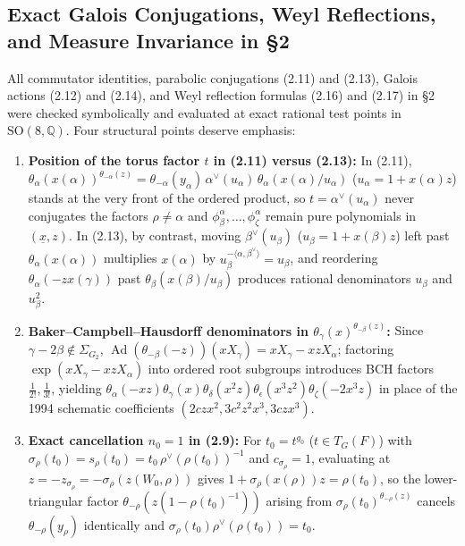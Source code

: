 \documentclass[11pt,letterpaper]{article}
\newcommand{\unx}{\underline{x}}
\DeclareMathOperator{\Ad}{Ad}
\begin{document}
\subsection{Exact Galois Conjugations, Weyl Reflections, and Measure Invariance in \S2}

All commutator identities, parabolic conjugations (2.11) and (2.13), Galois actions (2.12) and (2.14), and Weyl reflection formulas (2.16) and (2.17) in \S2 were checked symbolically and evaluated at exact rational test points in $\mathrm{SO}(8,\mathbb{Q})$. Four structural points deserve emphasis:
\begin{enumerate}[(1)]
\item \textbf{Position of the torus factor $t$ in (2.11) versus (2.13):} In (2.11), $\theta_\alpha(x(\alpha))^{\theta_{-\alpha}(z)} = \allowbreak \theta_{-\alpha}(y_\alpha)\,\alpha^\vee(u_\alpha)\,\allowbreak\theta_\alpha(x(\alpha)/u_\alpha)$ ($u_\alpha = 1+x(\alpha)z$) stands at the very front of the ordered product, so $t=\alpha^\vee(u_\alpha)$ never conjugates the factors $\rho\neq\alpha$ and $\phi_\beta^\alpha,\dots,\phi_\zeta^\alpha$ remain pure polynomials in $(\unx,z)$. In (2.13), by contrast, moving $\beta^\vee(u_\beta)$ ($u_\beta = 1+x(\beta)z$) left past $\theta_\alpha(x(\alpha))$ multiplies $x(\alpha)$ by $u_\beta^{-\langle\alpha,\beta^\vee\rangle} = u_\beta$, and reordering $\theta_\alpha(-zx(\gamma))$ past $\theta_\beta(x(\beta)/u_\beta)$ produces rational denominators $u_\beta$ and $u_\beta^2$.
\item \textbf{Baker--Campbell--Hausdorff denominators in $\theta_\gamma(x)^{\theta_{-\beta}(z)}$:} Since $\gamma-2\beta\notin\Sigma_{G_2}$, $\Ad(\theta_{-\beta}(-z))(xX_\gamma) = xX_\gamma - xzX_\alpha$; factoring $\exp(xX_\gamma - xzX_\alpha)$ into ordered root subgroups introduces BCH factors $\frac{1}{2!},\frac{1}{3!}$, yielding $\theta_\alpha(-xz)\theta_\gamma(x)\allowbreak\theta_\delta(x^2z)\theta_\epsilon(x^3z^2)\allowbreak\theta_\zeta(-2x^3z)$ in place of the 1994 schematic coefficients $(2czx^2,3c^2z^2x^3,3czx^3)$.
\item \textbf{Exact cancellation $n_0=1$ in (2.9):} For $t_0 = t^{g_0}$ ($t\in T_G(F)$) with $\sigma_\rho(t_0)=s_\rho(t_0)=t_0\,\rho^\vee(\rho(t_0))^{-1}$ and $c_{\sigma_\rho}=1$, evaluating at $z=-z_{\sigma_\rho}=-\sigma_\rho(z(W_0,\rho))$ gives $1+\sigma_\rho(x(\rho))z = \rho(t_0)$, so the lower-triangular factor $\theta_{-\rho}(z(1-\rho(t_0)^{-1}))$ arising from $\sigma_\rho(t_0)^{\theta_{-\rho}(z)}$ cancels $\theta_{-\rho}(y_\rho)$ identically and $\sigma_\rho(t_0)\rho^\vee(\rho(t_0)) = t_0$.

\end{enumerate}
\end{document}
